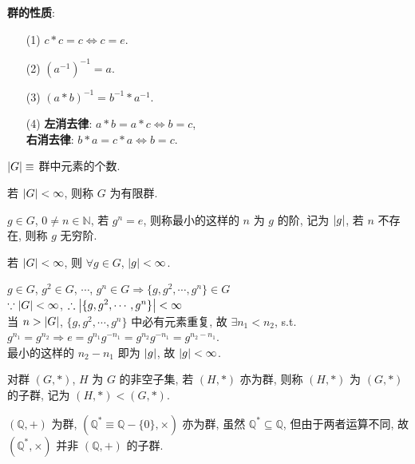 \documentclass{note}
\begin{document}
\textbf{群的性质}:
\begin{itemize}
    \item[(1)] $c*c=c\Longleftrightarrow c=e$.
    \item[(2)] $(a^{-1})^{-1}=a$.
    \item[(3)] $(a*b)^{-1}=b^{-1}*a^{-1}$.
    \item[(4)] \textbf{左消去律}: $a*b=a*c\Longleftrightarrow b=c$,\\
    \textbf{右消去律}: $b*a=c*a\Longleftrightarrow b=c$.
\end{itemize}

\begin{df}[群的阶]
    $\left\lvert G\right\rvert\equiv$ 群中元素的个数.
\end{df}

\begin{df}[有限群]
    若 $\left\lvert G\right\rvert<\infty$, 则称 $G$ 为有限群.
\end{df}

\begin{df}[群元素的阶]
    $g\in G$, $0\neq n\in\mathbb{N}$, 若 $g^n=e$, 则称最小的这样的 $n$ 为 $g$ 的阶, 记为 $\left\lvert g\right\rvert$, 若 $n$ 不存在, 则称 $g$ 无穷阶.
\end{df}

若 $\left\lvert G\right\rvert<\infty$, 则 $\forall g\in G$, $\left\lvert g\right\rvert<\infty$.
\begin{pf}
    $g\in G$, $g^2\in G$, $\cdots$, $g^n\in G\Longrightarrow\{g,g^2,\cdots,g^n\}\in G$\\
    $\because\left\lvert G\right\rvert<\infty$, $\therefore\left\lvert\{g,g^2,\cdots,g^n\}\right\rvert<\infty$\\
    当 $n>\left\lvert G\right\rvert$, $\{g,g^2,\cdots,g^n\}$ 中必有元素重复, 故 $\exists n_1<n_2$, s.t. $g^{n_1}=g^{n_2}\Longrightarrow e=g^{n_1}g^{-n_1}=g^{n_2}g^{-n_1}=g^{n_2-n_1}$.\\
    最小的这样的 $n_2-n_1$ 即为 $\left\lvert g\right\rvert$, 故 $\left\lvert g\right\rvert<\infty$.
\end{pf}

\begin{df}[子群]
    对群 $(G,*)$, $H$ 为 $G$ 的非空子集, 若 $(H,*)$ 亦为群, 则称 $(H,*)$ 为 $(G,*)$ 的子群, 记为 $(H,*)<(G,*)$.
\end{df}

\begin{eg}
    $(\mathbb{Q},+)$ 为群, $(\mathbb{Q}^*\equiv\mathbb{Q}-\{0\},\times)$ 亦为群, 虽然 $\mathbb{Q}^*\subseteq\mathbb{Q}$, 但由于两者运算不同, 故 $(\mathbb{Q}^*,\times)$ 并非 $(\mathbb{Q},+)$ 的子群.
\end{eg}
\end{document}
